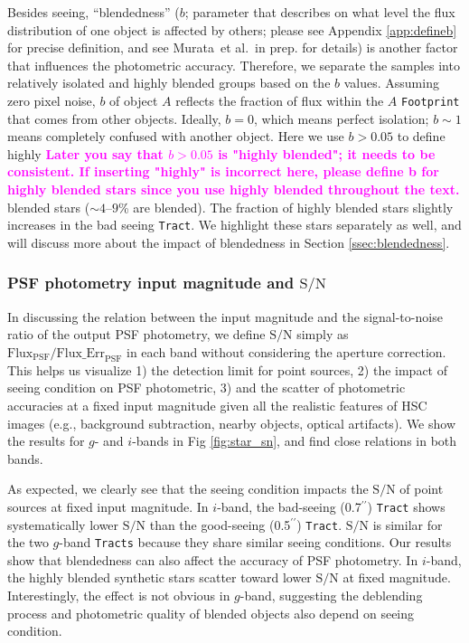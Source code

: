 \documentclass[useamsfonts]{pasj01}
\def\asec{$^{\prime\prime}$}
\def\etal{{\ et al.~}}
\def\tract{\texttt{Tract}}
\def\tracts{\texttt{Tracts}}
\def\s2n{{$\mathrm{S}/\mathrm{N}$}}
\newcommand{\susan}[1]{\textcolor{magenta} {\textbf{#1}}}
\begin{document}
    Besides seeing, ``blendedness'' ($b$; parameter that describes on what level
    the flux distribution of one object is affected by others; please see
    Appendix \ref{app:defineb} for precise definition, and see Murata\etal in prep.
    for details) is another factor that influences the photometric accuracy.
    Therefore, we separate the samples into relatively isolated and highly blended
    groups based on the $b$ values. 
    Assuming zero pixel noise, $b$ of object $A$ reflects the fraction of flux
    within the  $A$ \texttt{Footprint} that comes from other objects.
    Ideally, $b=0$, which means perfect isolation; $b{\sim}1$ means completely
    confused with another object.
    Here we use $b>0.05$ to define highly \susan{Later you say that $b>0.05$ is "highly blended"; it needs to be consistent. If inserting "highly" is incorrect here, please define b for highly blended stars since you use highly blended throughout the text.} blended stars (${\sim}4$--$9$\% are blended). 
    The fraction of highly blended stars slightly increases in the bad seeing \tract{}.
    We highlight these stars separately as well, and will discuss more about the
    impact of blendedness in Section \ref{ssec:blendedness}.

\subsubsection{PSF photometry input magnitude and \s2n{} }

    In discussing the relation between the input magnitude and the
    signal-to-noise ratio of the output PSF photometry, we define \s2n{} simply as
    $\mathrm{Flux}_{\mathrm{PSF}}/\mathrm{Flux\_Err}_{\mathrm{PSF}}$ in each band
    without considering the aperture correction.
    This helps us visualize
    1) the detection limit for point sources,
    2) the impact of seeing condition on PSF photometric,
    3) and the scatter of photometric accuracies at a fixed input magnitude given all
       the realistic features of HSC images (e.g., background subtraction, nearby
       objects, optical artifacts).
    We show the results for $g$- and $i$-bands in Fig \ref{fig:star_sn}, and find close
    relations in both bands.

    As expected, we clearly see that the seeing condition impacts the \s2n{} of point
    sources at fixed input magnitude.
    In  $i$-band, the bad-seeing (0.7\asec{}) \tract{}  shows systematically
    lower \s2n{} than the good-seeing (0.5\asec{}) \tract{}. 
     \s2n{} is similar for the two $g$-band \tracts{} because they share similar seeing conditions.
    Our results show that blendedness can also affect the accuracy of PSF photometry.
    In $i$-band, the highly blended synthetic stars scatter toward lower \s2n{} at
    fixed magnitude.
    Interestingly, the effect is not obvious in $g$-band, suggesting the deblending
    process and photometric quality of blended objects also depend on seeing condition.
\end{document}
